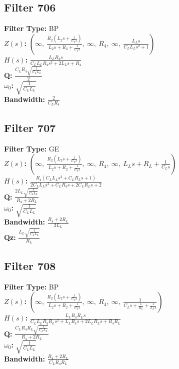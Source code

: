 \documentclass{article}
\begin{document}
\subsection*{Filter 706}
\textbf{Filter Type:} BP \\ 
\textbf{$Z(s)$:} $\left( \infty, \  \frac{R_{2} \left(L_{2} s + \frac{1}{C_{2} s}\right)}{L_{2} s + R_{2} + \frac{1}{C_{2} s}}, \  \infty, \  R_{4}, \  \infty, \  \frac{L_{L} s}{C_{L} L_{L} s^{2} + 1}\right)$ \\ 
\textbf{$H(s)$:} $\frac{L_{L} R_{4} s}{C_{L} L_{L} R_{4} s^{2} + 2 L_{L} s + R_{4}}$ \\ 
\textbf{Q:} $\frac{C_{L} R_{4} \sqrt{\frac{1}{C_{L} L_{L}}}}{2}$ \\ 
\textbf{$\omega_0$:} $\sqrt{\frac{1}{C_{L} L_{L}}}$ \\ 
\textbf{Bandwidth:} $\frac{2}{C_{L} R_{4}}$ \\ 
\subsection*{Filter 707}
\textbf{Filter Type:} GE \\ 
\textbf{$Z(s)$:} $\left( \infty, \  \frac{R_{2} \left(L_{2} s + \frac{1}{C_{2} s}\right)}{L_{2} s + R_{2} + \frac{1}{C_{2} s}}, \  \infty, \  R_{4}, \  \infty, \  L_{L} s + R_{L} + \frac{1}{C_{L} s}\right)$ \\ 
\textbf{$H(s)$:} $\frac{R_{4} \left(C_{L} L_{L} s^{2} + C_{L} R_{L} s + 1\right)}{2 C_{L} L_{L} s^{2} + C_{L} R_{4} s + 2 C_{L} R_{L} s + 2}$ \\ 
\textbf{Q:} $\frac{2 L_{L} \sqrt{\frac{1}{C_{L} L_{L}}}}{R_{4} + 2 R_{L}}$ \\ 
\textbf{$\omega_0$:} $\sqrt{\frac{1}{C_{L} L_{L}}}$ \\ 
\textbf{Bandwidth:} $\frac{R_{4} + 2 R_{L}}{2 L_{L}}$ \\ 
\textbf{Qz:} $\frac{L_{L} \sqrt{\frac{1}{C_{L} L_{L}}}}{R_{L}}$ \\ 
\subsection*{Filter 708}
\textbf{Filter Type:} BP \\ 
\textbf{$Z(s)$:} $\left( \infty, \  \frac{R_{2} \left(L_{2} s + \frac{1}{C_{2} s}\right)}{L_{2} s + R_{2} + \frac{1}{C_{2} s}}, \  \infty, \  R_{4}, \  \infty, \  \frac{1}{C_{L} s + \frac{1}{R_{L}} + \frac{1}{L_{L} s}}\right)$ \\ 
\textbf{$H(s)$:} $\frac{L_{L} R_{4} R_{L} s}{C_{L} L_{L} R_{4} R_{L} s^{2} + L_{L} R_{4} s + 2 L_{L} R_{L} s + R_{4} R_{L}}$ \\ 
\textbf{Q:} $\frac{C_{L} R_{4} R_{L} \sqrt{\frac{1}{C_{L} L_{L}}}}{R_{4} + 2 R_{L}}$ \\ 
\textbf{$\omega_0$:} $\sqrt{\frac{1}{C_{L} L_{L}}}$ \\ 
\textbf{Bandwidth:} $\frac{R_{4} + 2 R_{L}}{C_{L} R_{4} R_{L}}$ \\ 
\end{document}
